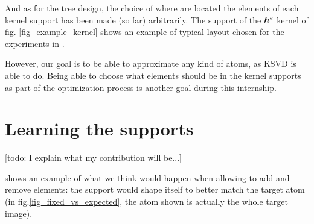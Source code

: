 And as for the tree design, the choice of where are located the elements of each kernel support has been made (so far) arbitrarily. The support of the $\bm{h}^e$ kernel of fig. \ref{fig_example_kernel} shows an example of typical layout chosen for the experiments in \cite{chabiron_optimization_2016}. 

However, our goal is to be able to approximate any kind of atoms, as \ac{KSVD} is able to do. Being able to choose what elements should be in the kernel supports as part of the optimization process is another goal during this internship.

\section{Learning the supports}
[todo: I explain what my contribution will be...]

 shows an example of what we think would happen when allowing to add and remove elements: the support would shape itself to better match the target atom (in fig.\ref{fig_fixed_vs_expected}, the atom shown is actually the whole target image).


